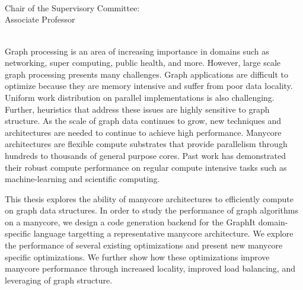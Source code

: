\begingroup
\let\clearpage\relax
\let\cleardoublepage\relax
\let\cleardoublepage\relax

\thispagestyle{empty}
\begin{center}
     \\
    \bigskip
    {\color{CTtitle}\spacedallcaps{\myTitle} \\ \bigskip
    }
    \bigskip
    \myName \\
    \bigskip
    Chair of the Supervisory Committee: \\
    Associate Professor \myChair \\
    \myDepartment \\
    \bigskip
\end{center}




\endgroup

\vfill
Graph processing is an area of increasing importance in domains such as networking, super computing, public health, and more.
However, large scale graph processing presents many challenges.
Graph applications are difficult to optimize because they are memory intensive and suffer from poor data locality.
Uniform work distribution on parallel implementations is also challenging.
Further, heuristics that address these issues are highly sensitive to graph structure.
As the scale of graph data continues to grow, new techniques and architectures are needed to continue to achieve high performance.
Manycore architectures are flexible compute substrates that provide parallelism through hundreds to thousands of general purpose cores.
Past work has demonstrated their robust compute performance on regular compute intensive tasks such as machine-learning and scientific computing.

This thesis explores the ability of manycore architectures to efficiently compute on graph data structures.
In order to study the performance of graph algorithms on a manycore, we design a code generation backend for the GraphIt domain-specific language targetting a representative manycore architecture.
We explore the performance of several existing optimizations and present new manycore specific optimizations.
We further show how these optimizations improve manycore performance through increased locality, improved load balancing, and leveraging of graph structure.
